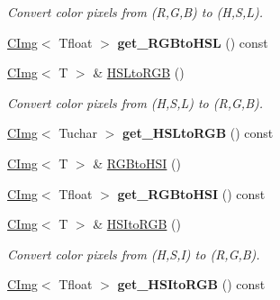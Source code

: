 \begin{DoxyCompactItemize}
\begin{DoxyCompactList}\small\item\em Convert color pixels from (R,G,B) to (H,S,L). \item\end{DoxyCompactList}\item 
\hypertarget{structcimg__library_1_1CImg_aa1f7ee6b049451a53aabc0b7e70d08b7}{
\hyperlink{structcimg__library_1_1CImg}{CImg}$<$ Tfloat $>$ {\bfseries get\_\-RGBtoHSL} () const }
\label{structcimg__library_1_1CImg_aa1f7ee6b049451a53aabc0b7e70d08b7}

\item 
\hypertarget{structcimg__library_1_1CImg_a0e2080f7ef8f8c87587800de0c5d9f31}{
\hyperlink{structcimg__library_1_1CImg}{CImg}$<$ T $>$ \& \hyperlink{structcimg__library_1_1CImg_a0e2080f7ef8f8c87587800de0c5d9f31}{HSLtoRGB} ()}
\label{structcimg__library_1_1CImg_a0e2080f7ef8f8c87587800de0c5d9f31}

\begin{DoxyCompactList}\small\item\em Convert color pixels from (H,S,L) to (R,G,B). \item\end{DoxyCompactList}\item 
\hypertarget{structcimg__library_1_1CImg_a99e0396f5b174adfc0c4c2aa3906c930}{
\hyperlink{structcimg__library_1_1CImg}{CImg}$<$ Tuchar $>$ {\bfseries get\_\-HSLtoRGB} () const }
\label{structcimg__library_1_1CImg_a99e0396f5b174adfc0c4c2aa3906c930}

\item 
\hyperlink{structcimg__library_1_1CImg}{CImg}$<$ T $>$ \& \hyperlink{structcimg__library_1_1CImg_ae5820d33b36cc0266b98c0d9c9f0c3a6}{RGBtoHSI} ()
\item 
\hypertarget{structcimg__library_1_1CImg_a0c559231596d2ef30686dd9ca73c35b8}{
\hyperlink{structcimg__library_1_1CImg}{CImg}$<$ Tfloat $>$ {\bfseries get\_\-RGBtoHSI} () const }
\label{structcimg__library_1_1CImg_a0c559231596d2ef30686dd9ca73c35b8}

\item 
\hypertarget{structcimg__library_1_1CImg_a342709e04c2efd6b07982b1e9b5b5671}{
\hyperlink{structcimg__library_1_1CImg}{CImg}$<$ T $>$ \& \hyperlink{structcimg__library_1_1CImg_a342709e04c2efd6b07982b1e9b5b5671}{HSItoRGB} ()}
\label{structcimg__library_1_1CImg_a342709e04c2efd6b07982b1e9b5b5671}

\begin{DoxyCompactList}\small\item\em Convert color pixels from (H,S,I) to (R,G,B). \item\end{DoxyCompactList}\item 
\hypertarget{structcimg__library_1_1CImg_afa1f3bbdd3482181416bee34a3cf5a3b}{
\hyperlink{structcimg__library_1_1CImg}{CImg}$<$ Tfloat $>$ {\bfseries get\_\-HSItoRGB} () const }
\label{structcimg__library_1_1CImg_afa1f3bbdd3482181416bee34a3cf5a3b}


\end{DoxyCompactItemize}
